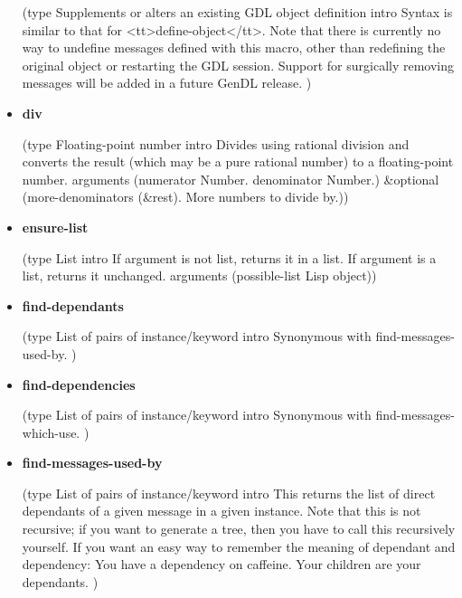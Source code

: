 \documentclass [11pt]{book}
\begin{document}
\begin{itemize}
(type Supplements or alters an existing GDL object definition intro
  Syntax is similar to that for <tt>define-object</tt>.
Note that there is currently no way to undefine messages defined with this macro, other than redefining the
original object or restarting the GDL session. Support for surgically removing messages will be added in a
future GenDL release.
)



\item {}
\label{prim:div}
\textbf{div}

(type Floating-point number intro
  Divides using rational division and converts the result (which may be a pure rational number)
to a floating-point number.
 arguments (numerator Number. denominator Number.) \&optional
 (more-denominators (\&rest). More numbers to divide by.))



\item {}
\label{prim:ensure-list}
\textbf{ensure-list}

(type List intro
  If argument is not list, returns it in a list. If argument is
a list, returns it unchanged.
 arguments (possible-list Lisp object))



\item {}
\label{prim:find-dependants}
\textbf{find-dependants}

(type List of pairs of instance/keyword intro
  Synonymous with find-messages-used-by.
)



\item {}
\label{prim:find-dependencies}
\textbf{find-dependencies}

(type List of pairs of instance/keyword intro
  Synonymous with find-messages-which-use.
)



\item {}
\label{prim:find-messages-used-by}
\textbf{find-messages-used-by}

(type List of pairs of instance/keyword intro
  This returns the list of direct dependants of a given
message in a given instance. Note that this is not recursive; if you want to generate a tree,
then you have to call this recursively yourself.
If you want an easy way to remember the meaning of dependant and dependency:
You have a dependency on caffeine. Your children are your dependants.
)




\end{itemize}
\end{document}
